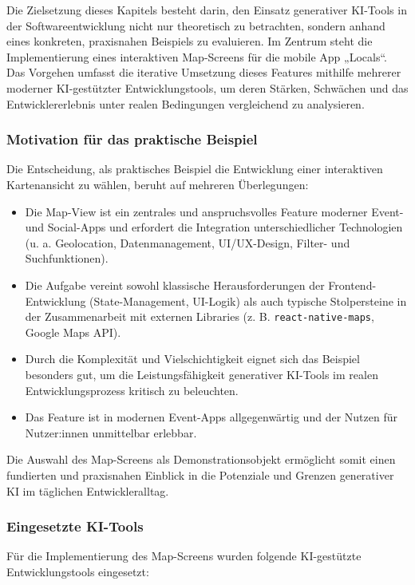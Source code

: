 Die Zielsetzung dieses Kapitels besteht darin, den Einsatz generativer KI-Tools
in der Softwareentwicklung nicht nur theoretisch zu betrachten, sondern anhand
eines konkreten, praxisnahen Beispiels zu evaluieren. Im Zentrum steht die
Implementierung eines interaktiven Map-Screens für die mobile App „Locals“. Das
Vorgehen umfasst die iterative Umsetzung dieses Features mithilfe mehrerer
moderner KI-gestützter Entwicklungstools, um deren Stärken, Schwächen und das
Entwicklererlebnis unter realen Bedingungen vergleichend zu analysieren.

\subsubsection{Motivation für das praktische Beispiel}

Die Entscheidung, als praktisches Beispiel die Entwicklung einer interaktiven
Kartenansicht zu wählen, beruht auf mehreren Überlegungen:
\begin{itemize}
    \item Die Map-View ist ein zentrales und anspruchsvolles Feature moderner Event- und
          Social-Apps und erfordert die Integration unterschiedlicher Technologien (u. a.
          Geolocation, Datenmanagement, UI/UX-Design, Filter- und Suchfunktionen).
    \item Die Aufgabe vereint sowohl klassische Herausforderungen der
          Frontend-Entwicklung (State-Management, UI-Logik) als auch typische
          Stolpersteine in der Zusammenarbeit mit externen Libraries (z. B.
          \texttt{react-native-maps}, Google Maps API).
    \item Durch die Komplexität und Vielschichtigkeit eignet sich das Beispiel besonders
          gut, um die Leistungsfähigkeit generativer KI-Tools im realen
          Entwicklungsprozess kritisch zu beleuchten.
    \item Das Feature ist in modernen Event-Apps allgegenwärtig und der Nutzen für
          Nutzer:innen unmittelbar erlebbar.
\end{itemize}
Die Auswahl des Map-Screens als Demonstrationsobjekt ermöglicht somit einen fundierten und praxisnahen Einblick in die Potenziale und Grenzen generativer KI im täglichen Entwickleralltag.

\subsubsection{Eingesetzte KI-Tools}

Für die Implementierung des Map-Screens wurden folgende KI-gestützte
Entwicklungstools eingesetzt:

